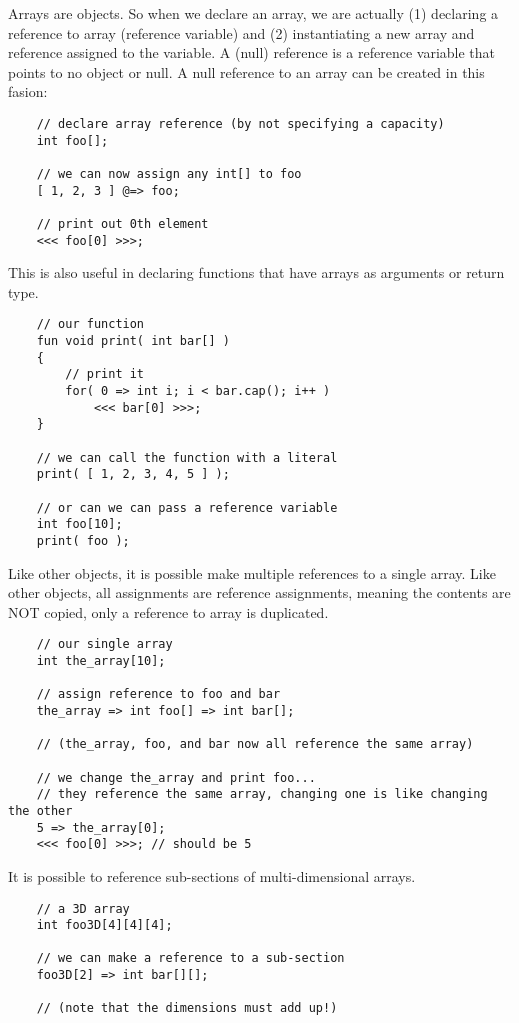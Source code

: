 Arrays are objects. So when we declare an array, we are actually (1) declaring a reference to array (reference variable) and (2) instantiating a new array and reference assigned to the variable. A (null) reference is a reference variable that points to no
 object or null. A null reference to an array can be created in this fasion:
\begin{verbatim}
    // declare array reference (by not specifying a capacity)
    int foo[];

    // we can now assign any int[] to foo
    [ 1, 2, 3 ] @=> foo;

    // print out 0th element
    <<< foo[0] >>>;
\end{verbatim}

This is also useful in declaring functions that have arrays as arguments or return type.
\begin{verbatim}
    // our function
    fun void print( int bar[] )
    {
        // print it
        for( 0 => int i; i < bar.cap(); i++ )
            <<< bar[0] >>>;
    }

    // we can call the function with a literal
    print( [ 1, 2, 3, 4, 5 ] );

    // or can we can pass a reference variable
    int foo[10];
    print( foo );
\end{verbatim}

Like other objects, it is possible make multiple references to a single array. Like other objects, all assignments are reference assignments, meaning the contents are NOT copied, only a reference to array is duplicated.
\begin{verbatim}
    // our single array
    int the_array[10];

    // assign reference to foo and bar
    the_array => int foo[] => int bar[];

    // (the_array, foo, and bar now all reference the same array)

    // we change the_array and print foo...
    // they reference the same array, changing one is like changing the other
    5 => the_array[0];
    <<< foo[0] >>>; // should be 5
\end{verbatim}

It is possible to reference sub-sections of multi-dimensional arrays.
\begin{verbatim}
    // a 3D array
    int foo3D[4][4][4];

    // we can make a reference to a sub-section
    foo3D[2] => int bar[][];

    // (note that the dimensions must add up!)
\end{verbatim}
